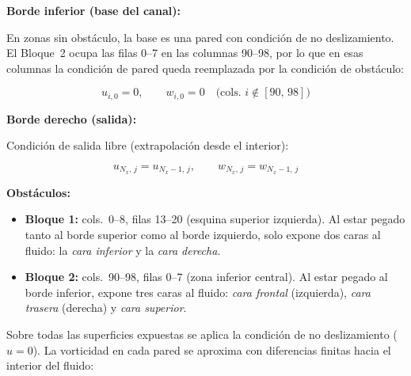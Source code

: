 \documentclass[12pt, a4paper]{article}
\begin{document}
\bigskip
\noindent\textbf{Borde inferior (base del canal):}

En zonas sin obstáculo, la base es una pared con condición de no deslizamiento.
El Bloque~2 ocupa las filas 0--7 en las columnas 90--98, por lo que en esas
columnas la condición de pared queda reemplazada por la condición de obstáculo:

\begin{equation}
  u_{i,0} = 0, \qquad w_{i,0} = 0
  \quad \text{(cols.\ } i \notin [90,\,98]\text{)}
\end{equation}

\bigskip
\noindent\textbf{Borde derecho (salida):}

Condición de salida libre (extrapolación desde el interior):

\begin{equation}
  u_{N_x,\,j} = u_{N_x-1,\,j}, \qquad w_{N_x,\,j} = w_{N_x-1,\,j}
\end{equation}

\bigskip
\noindent\textbf{Obstáculos:}

\begin{itemize}
  \item \textbf{Bloque 1:} cols.\ 0--8, filas 13--20 (esquina superior izquierda).
        Al estar pegado tanto al borde superior como al borde izquierdo, solo
        expone dos caras al fluido: la \emph{cara inferior} y la \emph{cara derecha}.
  \item \textbf{Bloque 2:} cols.\ 90--98, filas 0--7 (zona inferior central).
        Al estar pegado al borde inferior, expone tres caras al fluido:
        \emph{cara frontal} (izquierda), \emph{cara trasera} (derecha) y
        \emph{cara superior}.
\end{itemize}

Sobre todas las superficies expuestas se aplica la condición de no deslizamiento
($u = 0$). La vorticidad en cada pared se aproxima con diferencias finitas hacia
el interior del fluido:
\end{document}
